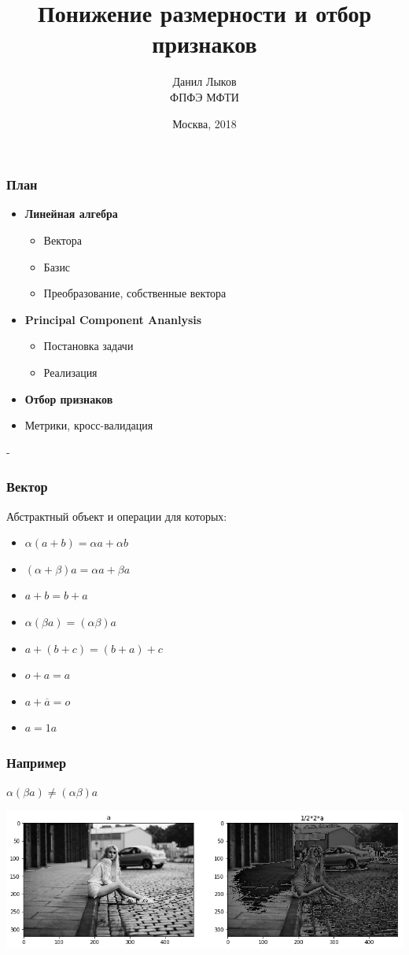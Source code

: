 \documentclass[14pt]{beamer}
\title{\small{Понижение размерности и отбор признаков}}
\author{\small{%
	Данил Лыков
}\\%
\vspace{30pt}%
ФПФЭ МФТИ
\vspace{20pt}%
}
\date{\small{Москва, 2018}}
\begin{document}
\maketitle
\begin{frame}
\frametitle{План}
\begin{itemize}
  \item \textbf{Линейная алгебра} 
	  \begin {itemize}
		\item  Вектора
		\item  Базис
		\item  Преобразование, собственные вектора
	  \end {itemize}
  \item \textbf{Principal Component Ananlysis} 
	  \begin {itemize}
		\item  Постановка задачи
		\item  Реализация
	  \end {itemize}
  \item \textbf{Отбор признаков} 
  \item{Метрики, кросс-валидация} 
\end{itemize}
\end{frame}- 
\begin{frame}
	\frametitle{Вектор}
	Абстрактный объект и операции для которых:
		\pause
	  \begin{itemize}
		  \item \( \alpha (a + b) = \alpha a + \alpha b\)
		  \item \( (\alpha + \beta )a = \alpha a + \beta a\)
			  \vspace{3pt}
			  \pause
		  \item \( a+b = b+a \)
		  \item \( \alpha (\beta a) = (\alpha \beta)a\)
		  \item \( a+(b+c) = (b+a)+c \)
			  \vspace{3pt}
			  \pause
		  \item \( o + a= a \)
		  \item \( a + \overline{a} = o\)
		  \item \( a=1a\)
	  \end{itemize}
\end{frame}

\begin{frame}
\frametitle{Например}
	\vspace{-2em}
	\begin{center}
	   \( \alpha (\beta a) \neq (\alpha \beta)a\)
	\end{center}
    \includegraphics[width=\textwidth]{girl-ok.png}
\end{frame}
\end{document}
